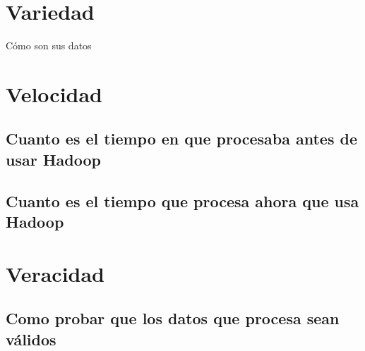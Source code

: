 \clearpage
\section{Variedad}
Cómo son sus datos
\lipsum[1] %

\clearpage
\section{Velocidad}

\subsection{Cuanto es el tiempo en que procesaba antes de usar Hadoop}
\lipsum[1] %

\subsection{Cuanto es el tiempo que procesa ahora que usa Hadoop}


\clearpage
\section{Veracidad}

\subsection{Como probar que los datos que procesa sean válidos}
\lipsum[1] %

\clearpage
